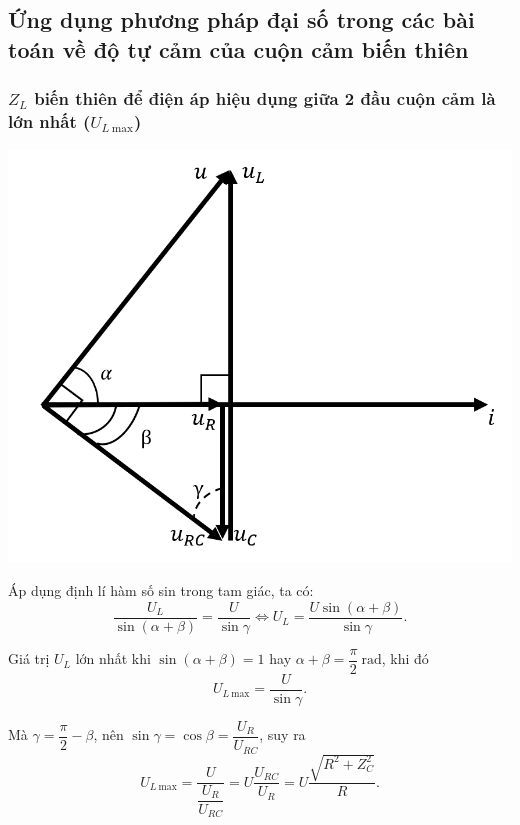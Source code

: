 \subsection{Ứng dụng phương pháp đại số trong các bài toán về độ tự cảm của cuộn cảm biến thiên}
\subsubsection{$Z_L$ biến thiên để điện áp hiệu dụng giữa 2 đầu cuộn cảm là lớn nhất ($U_{L\ \text{max}}$)}

\begin{center}
	\includegraphics[scale=0.45]{../figs/VN12-PH-19-A-011-5-V2-1.png}
\end{center}

Áp dụng định lí hàm số sin trong tam giác, ta có:
\begin{equation*}
	\dfrac{U_L}{\sin(\alpha+\beta)}= \dfrac{U}{\sin \gamma}
	\Leftrightarrow U_L = \dfrac{U\sin(\alpha+\beta)}{ \sin \gamma}.
\end{equation*}

Giá trị $U_L$ lớn nhất khi $\sin(\alpha+\beta)=1$ hay $\alpha+\beta = \dfrac{\pi}{2}\ \text {rad}$, khi đó
\begin{equation*}
	U_{L\ \text{max}}=\dfrac{U}{\sin \gamma}.
\end{equation*}

Mà $\gamma = \dfrac{\pi}{2} - \beta$, nên $\sin \gamma = \cos \beta = \dfrac{U_R}{U_{RC}}$,
suy ra
\begin{equation*}
	U_{L\ \text{max}}=\dfrac{U}{\dfrac{U_R}{U_{RC}}}=U\dfrac{U_{RC}}{U_R}=U\dfrac{\sqrt{R^2 + Z_C^2}}{R}.
\end{equation*}

